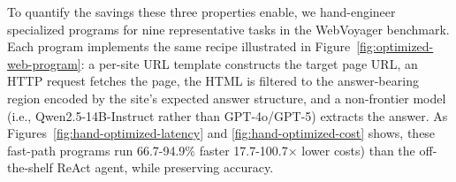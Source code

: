 

To quantify the savings these three properties enable, we hand-engineer specialized programs for nine representative tasks in the WebVoyager benchmark. Each program implements the same recipe illustrated in Figure~\ref{fig:optimized-web-program}: a per-site URL template constructs the target page URL, an HTTP request fetches the page, the HTML is filtered to the answer-bearing region encoded by the site's expected answer structure, and a non-frontier model (i.e., Qwen2.5-14B-Instruct rather than GPT-4o/GPT-5) extracts the answer. As Figures~\ref{fig:hand-optimized-latency} and \ref{fig:hand-optimized-cost} shows, these fast-path programs run 66.7-94.9\% faster 17.7-100.7$\times$ lower costs) than the off-the-shelf ReAct agent, while preserving accuracy.

